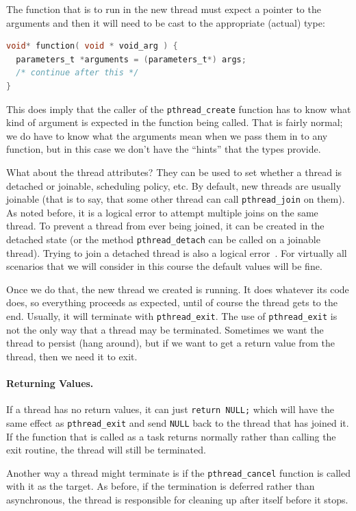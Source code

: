 The function that is to run in the new thread must expect a pointer to the arguments and then it will need to be cast to the appropriate (actual) type:
\begin{lstlisting}[language=C]
void* function( void * void_arg ) {
  parameters_t *arguments = (parameters_t*) args;
  /* continue after this */
}
\end{lstlisting}

This does imply that the caller of the \texttt{pthread\_create} function has to know what kind of argument is expected in the function being called. That is fairly normal; we do have to know what the arguments mean when we pass them in to any function, but in this case we don't have the ``hints'' that the types provide.

What about the thread attributes? They can be used to set whether a thread is detached or joinable, scheduling policy, etc. By default, new threads are usually joinable (that is to say, that some other thread can call \texttt{pthread\_join} on them). As noted before, it is a logical error to attempt multiple joins on the same thread. To prevent a thread from ever being joined, it can be created in the detached state (or the method \texttt{pthread\_detach} can be called on a joinable thread). Trying to join a detached thread is also a logical error~\cite{pthreads}. For virtually all scenarios that we will consider in this course the default values will be fine.

Once we do that, the new thread we created is running. It does whatever its code does, so everything proceeds as expected, until of course the thread gets to the end. Usually, it will terminate with \texttt{pthread\_exit}. The use of \texttt{pthread\_exit} is not the only way that a thread may be terminated. Sometimes we want the thread to persist (hang around), but if we want to get a return value from the thread, then we need it to exit.

\paragraph{Returning Values.} If a thread has no return values, it can just \texttt{return NULL;} which will have the same effect as \texttt{pthread\_exit} and send \texttt{NULL} back to the thread that has joined it. If the function that is called as a task returns normally rather than calling the exit routine, the thread will still be terminated.

Another way a thread might terminate is if the \texttt{pthread\_cancel} function is called with it as the target. As before, if the termination is deferred rather than asynchronous, the thread is responsible for cleaning up after itself before it stops.

